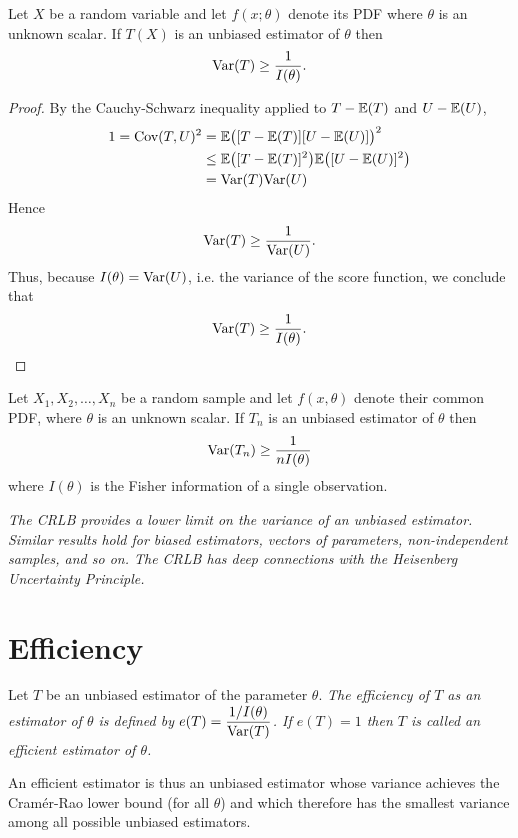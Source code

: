\begin{theorem}[CRLB]\label{thm:crlb}
Let $X$ be a random variable and let $f(x;\theta)$ denote its PDF where $\theta$ is an unknown scalar. If $T(X)$ is an unbiased estimator of $\theta$ then
\[
\text{Var}(T) \geq \frac{1}{I(\theta)}.
\]
\end{theorem}

\begin{proof}
By the Cauchy-Schwarz inequality applied to $T-\mathbb{E}(T)$ and $U-\mathbb{E}(U)$,
\begin{align*}
1 = \text{Cov}(T,U)^2
	& = \mathbb{E}\big([T-\mathbb{E}(T)][U-\mathbb{E}(U)]\big)^2 \\
	& \leq \mathbb{E}\big([T-\mathbb{E}(T)]^2\big)\mathbb{E}\big([U-\mathbb{E}(U)]^2\big) \\
	& = \text{Var}(T)\text{Var}(U)
\end{align*}
Hence
\[
\text{Var}(T) \geq \frac{1}{\text{Var}(U)}.
\]
Thus, because $I(\theta)=\text{Var}(U)$, i.e. the variance of the score function, we conclude that
\[
\text{Var}(T) \geq \frac{1}{I(\theta)}.
\]
\end{proof}

\begin{corollary}\label{cor:crlb}
Let $X_1,X_2,\ldots,X_n$ be a random sample and let $f(x,\theta)$ denote their common PDF, where $\theta$ is an unknown scalar. If $T_n$ is an unbiased estimator of $\theta$ then
\[
\text{Var}(T_n) \geq \frac{1}{nI(\theta)}
\]
where $I(\theta)$ is the Fisher information of a single observation.
\end{corollary}

\begin{remark}
\bit
\it The CRLB provides a \emph{lower limit} on the variance of an unbiased estimator.
\it Similar results hold for biased estimators, vectors of parameters, non-independent samples, and so on.
\it The CRLB has deep connections with the \emph{Heisenberg Uncertainty Principle}.
\eit
\end{remark}

\section{Efficiency}

\begin{definition}
Let $T$ be an unbiased estimator of the parameter $\theta$.
\ben
\it 
The \emph{efficiency} of $T$ as an estimator of $\theta$ is defined by 
$e(T) = \displaystyle\frac{1/I(\theta)}{\text{Var}(T)}$.
\it 
If $e(T)=1$ then $T$ is called an \emph{efficient} estimator of $\theta$.
\een
\end{definition}
An efficient estimator is thus an unbiased estimator whose variance achieves the Cram\'{e}r-Rao lower bound (for all $\theta$) and which therefore has the smallest variance among all possible unbiased estimators.

